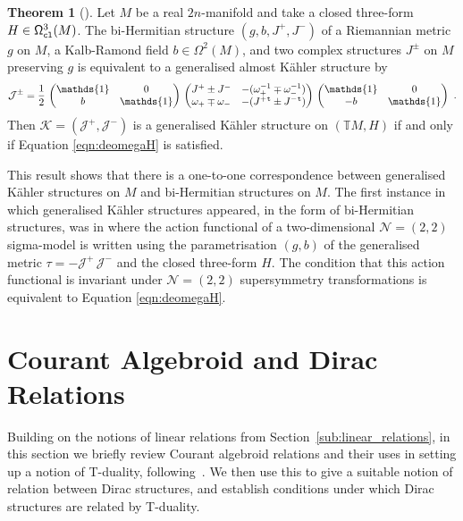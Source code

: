 \documentclass[a4paper, reqno, 11pt]{amsart}
\numberwithin{equation}{section}
\theoremstyle{definition}
\newtheorem{theorem}[equation]{Theorem}
\newcommand{\IT}{\mathbb{T}}
\newcommand{\cN}{{\mathcal N}}
\newcommand{\cK}{{\mathcal K}}
\newcommand{\cJ}{{\mathcal J}}
\newcommand{\sfOmega}{{\mathsf{\Omega}}}
\newcommand{\unit}{\mathds{1}}   			%
\theoremstyle{remark}
\begin{document}
\begin{theorem}[\!\!\!\textbf{\cite[Theorem 6.37]{gualtieri:tesi}}]
    Let $M$ be a real $2n$-manifold and take a closed three-form $H\in \sfOmega_{\tt cl}^3(M)$. The bi-Hermitian structure $(g,b,J^+,J^-)$ of a Riemannian metric $g$ on $M$, a Kalb-Ramond field $b\in \sfOmega^2(M)$, and two complex structures $J^\pm$ on $M$ preserving $g$ is equivalent to a generalised almost K\"ahler structure by 
    \begin{align}
        \cJ^\pm = \frac 12\, \begin{pmatrix}
            \unit & 0 \\
            b & \unit
        \end{pmatrix}\,
        \begin{pmatrix}
            J^+ \pm J^- & -(\omega_+^{-1} \mp \omega_-^{-1}) \\
            \omega_+ \mp \omega_- & -(J^+{}^{\tt t} \pm J^-{}^{\tt t})
        \end{pmatrix}\,
        \begin{pmatrix}
            \unit & 0 \\
            -b & \unit
        \end{pmatrix} \ .
    \end{align}
    Then $\cK = (\cJ^+, \cJ^-)$ is a generalised K\"ahler structure on $(\IT M, H)$ if and only if Equation \eqref{eqn:deomegaH} is satisfied.
\end{theorem}

This result shows that there is a one-to-one correspondence between generalised K{\"a}hler structures on $M$ and bi-Hermitian structures on $M$. The first instance in which generalised K{\"a}hler structures appeared, in the form of bi-Hermitian structures, was in \cite{Gates:1984nk} where the action functional of a two-dimensional $\cN=(2,2)$ sigma-model is written using the parametrisation $(g,b)$ of the generalised metric $\tau=-\cJ^+\,\cJ^-$ and the closed three-form $H$. The condition that this action functional is invariant under $\cN=(2,2)$ supersymmetry transformations is equivalent to Equation \eqref{eqn:deomegaH}.

\section{Courant Algebroid and Dirac Relations} 
\label{sect:section4}

Building on the notions of linear relations from Section~\ref{sub:linear_relations}, in this section we briefly review Courant algebroid relations and their uses in setting up a notion of T-duality, following~\cite{Vysoky2020hitchiker,DeFraja:2023fhe}. We then use this to give a suitable notion of relation between Dirac structures, and establish conditions under which Dirac structures are related by T-duality.
\end{document}
